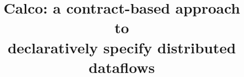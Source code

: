 \documentclass[sigconf]{acmart}
\theoremstyle{remark}
\begin{document}

\title{Calco: a contract-based approach to \\declaratively specify distributed dataflows}

\end{document}
